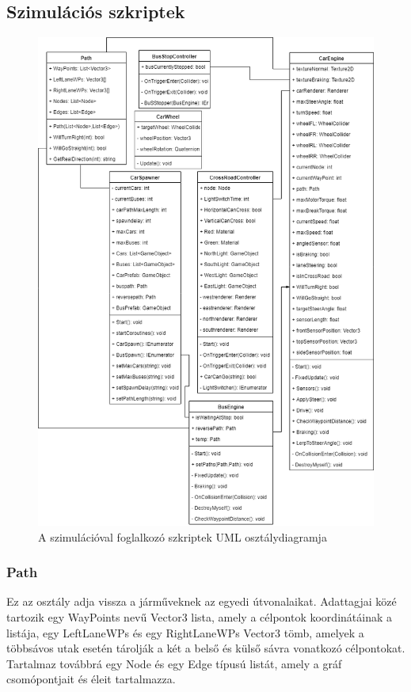 \subsection{Szimulációs szkriptek}
\begin{figure}[H]
\includegraphics[scale=0.53,keepaspectratio]{simuml.png}
\caption{A szimulációval foglalkozó szkriptek UML osztálydiagramja}
\label{fig:simuml}
\end{figure}
\subsubsection{Path}
Ez az osztály adja vissza a járműveknek az egyedi útvonalaikat. Adattagjai közé tartozik egy WayPoints nevű Vector3 lista, amely a célpontok koordinátáinak a listája, egy LeftLaneWPs és egy RightLaneWPs Vector3 tömb, amelyek a többsávos utak esetén tárolják a két a belső és külső sávra vonatkozó célpontokat. Tartalmaz továbbrá egy Node és egy Edge típusú listát, amely a gráf csomópontjait és éleit tartalmazza.

